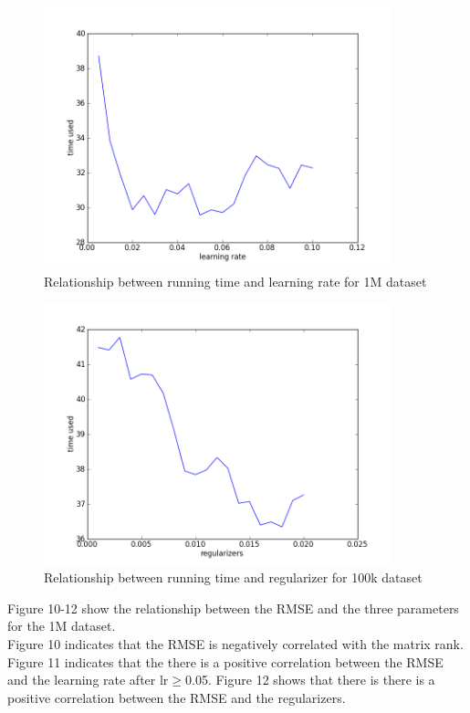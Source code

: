 \documentclass[12pt]{article}
\begin{document}
\begin{figure}[H]
\centering
\includegraphics[width=0.90\textwidth]{bigtimelr.png}
\caption{Relationship between running time and learning rate for 1M dataset}
\end{figure}

\begin{figure}[H]
\centering
\includegraphics[width=0.90\textwidth]{bigtimereg.png}
\caption{Relationship between running time and regularizer for 100k dataset}
\end{figure}

\noindent Figure 10-12 show the relationship between the RMSE and the three parameters
for the 1M dataset. \\

\noindent Figure 10 indicates that the RMSE is negatively correlated
with the matrix rank. Figure 11 indicates that the there is a positive correlation
between the RMSE and the learning rate after lr$\geq$0.05. Figure 12 shows that 
there is there is a positive correlation between the RMSE and the regularizers.
\end{document}

